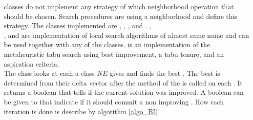  classes do not implement any strategy of which neighborhood operation that should be chosen. 
Search procedures are using a neighborhood and define this strategy. The classes implemented 
are , , , and . 
, \\ , and  are implementation of local search 
algorithms of almost same name and can be used together with any of the  classes. 
 is an implementation of the metaheuristic tabu search using best improvement, a tabu tenure, and 
an aspiration criteria. \medskip \\
The class  looks at each  a  class $NE$ gives and finds the 
best . The best  is determined from their delta vector after the method  
of the  is called on each . It returns a boolean that tells if the current solution was 
improved. A boolean can be given to  that indicate if it should commit a non improving 
. How each iteration is done is describe by algorithm \ref{algo_BI} \\ 
 \\

